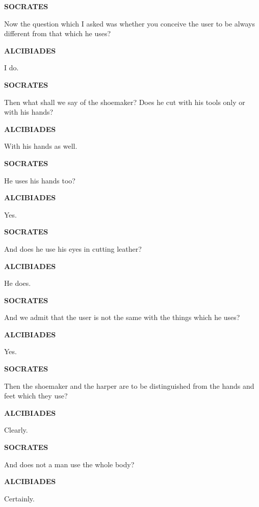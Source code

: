 \documentclass[11pt,letter]{article}
\begin{document}
\par \textbf{SOCRATES}
\par   Now the question which I asked was whether you conceive the user to be always different from that which he uses?

\par \textbf{ALCIBIADES}
\par   I do.

\par \textbf{SOCRATES}
\par   Then what shall we say of the shoemaker? Does he cut with his tools only or with his hands?

\par \textbf{ALCIBIADES}
\par   With his hands as well.

\par \textbf{SOCRATES}
\par   He uses his hands too?

\par \textbf{ALCIBIADES}
\par   Yes.

\par \textbf{SOCRATES}
\par   And does he use his eyes in cutting leather?

\par \textbf{ALCIBIADES}
\par   He does.

\par \textbf{SOCRATES}
\par   And we admit that the user is not the same with the things which he uses?

\par \textbf{ALCIBIADES}
\par   Yes.

\par \textbf{SOCRATES}
\par   Then the shoemaker and the harper are to be distinguished from the hands and feet which they use?

\par \textbf{ALCIBIADES}
\par   Clearly.

\par \textbf{SOCRATES}
\par   And does not a man use the whole body?

\par \textbf{ALCIBIADES}
\par   Certainly.
\end{document}
